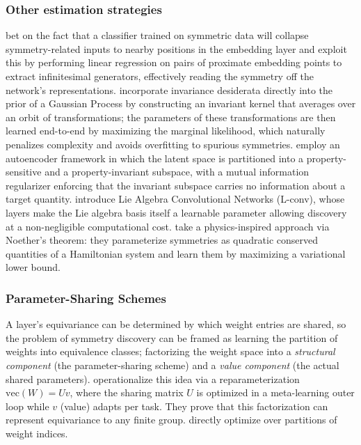 \documentclass[mathematics,review,submit,moreauthors]{Definitions/mdpi}
\begin{document}
\subsubsection{Other estimation strategies}
\citet{krippendorf2020} bet on the fact that a classifier trained on symmetric data will collapse symmetry-related inputs to nearby positions in the embedding layer and exploit this by performing linear regression on pairs of proximate embedding points to extract infinitesimal generators, effectively reading the symmetry off the network's representations.
\citet{vanderwilk2018anips} incorporate invariance desiderata directly into the prior of a Gaussian Process by constructing an invariant kernel that averages over an orbit of transformations; the parameters of these transformations are then learned end-to-end by maximizing the marginal likelihood, which naturally penalizes complexity and avoids overfitting to spurious symmetries.
\citet{wieser2020anips} employ an autoencoder framework in which the latent space is partitioned into a property-sensitive and a property-invariant subspace, with a mutual information regularizer enforcing that the invariant subspace carries no information about a target quantity.
\citet{dehmamy2021anips} introduce Lie Algebra Convolutional Networks (L-conv), whose layers make the Lie algebra basis itself a learnable parameter allowing discovery at a non-negligible computational cost.
\citet{ouderaa2024} take a physics-inspired approach via Noether's theorem: they parameterize symmetries as quadratic conserved quantities of a Hamiltonian system and learn them by maximizing a variational lower bound.

\subsubsection{Parameter-Sharing Schemes}
A layer's equivariance can be determined by which weight entries are shared, so the problem of symmetry discovery can be framed as learning the partition of weights into equivalence classes; factorizing the weight space into a \textit{structural component} (the parameter-sharing scheme) and a \textit{value component} (the actual shared parameters).
\citet{zhou2021} operationalize this idea via a reparameterization $\mathrm{vec}(W) = Uv$, where the sharing matrix $U$ is optimized in a meta-learning outer loop while $v$ (value) adapts per task.
They prove that this factorization can represent equivariance to any finite group.
\citet{yeh2022p2icais} directly optimize over partitions of weight indices.
\end{document}
